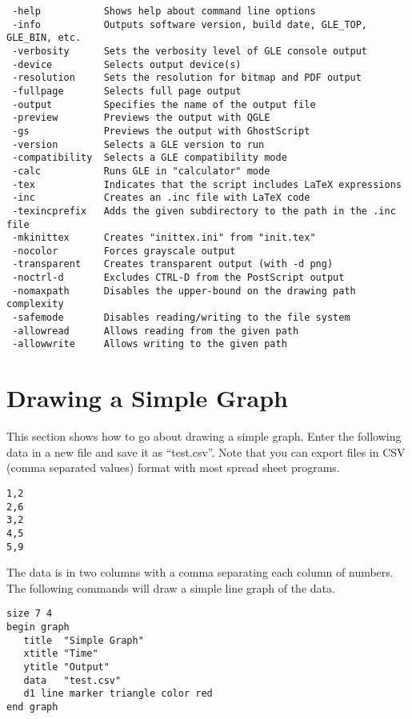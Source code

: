 \preglecode{}
\begin{Verbatim}
 -help           Shows help about command line options
 -info           Outputs software version, build date, GLE_TOP, GLE_BIN, etc.
 -verbosity      Sets the verbosity level of GLE console output
 -device         Selects output device(s)
 -resolution     Sets the resolution for bitmap and PDF output
 -fullpage       Selects full page output
 -output         Specifies the name of the output file
 -preview        Previews the output with QGLE
 -gs             Previews the output with GhostScript
 -version        Selects a GLE version to run
 -compatibility  Selects a GLE compatibility mode
 -calc           Runs GLE in "calculator" mode
 -tex            Indicates that the script includes LaTeX expressions
 -inc            Creates an .inc file with LaTeX code
 -texincprefix   Adds the given subdirectory to the path in the .inc file
 -mkinittex      Creates "inittex.ini" from "init.tex"
 -nocolor        Forces grayscale output
 -transparent    Creates transparent output (with -d png)
 -noctrl-d       Excludes CTRL-D from the PostScript output
 -nomaxpath      Disables the upper-bound on the drawing path complexity
 -safemode       Disables reading/writing to the file system
 -allowread      Allows reading from the given path
 -allowwrite     Allows writing to the given path
\end{Verbatim}
\postglecode{}

\section{Drawing a Simple Graph}

This section shows how to go about drawing a simple graph. Enter the following data in a new file and save it as ``test.csv''. Note that you can export files in CSV (comma separated values) format with most spread sheet programs.

\preglecode{}
\begin{Verbatim}
1,2
2,6
3,2
4,5
5,9
\end{Verbatim}
\postglecode{}

 
The data is in two columns with a comma separating each column of numbers. The following commands will draw a simple line graph of the data.

\preglegraph{}
\begin{minipage}[c]{8cm}
\begin{Verbatim}
size 7 4
begin graph
   title  "Simple Graph"
   xtitle "Time"
   ytitle "Output"
   data   "test.csv"
   d1 line marker triangle color red
end graph
\end{Verbatim}
\end{minipage}
\hfill
\begin{minipage}[c]{7cm}
\mbox{}
\end{minipage}
\postglegraph{}


